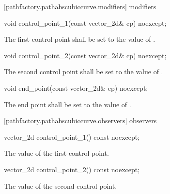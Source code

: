  [pathfactory.pathabscubiccurve.modifiers]{ modifiers}

\begin{itemdecl}
    void control_point_1(const vector_2d& cp) noexcept;
\end{itemdecl}
\begin{itemdescr}
	\pnum
	\effects
	The first control point shall be set to the value of .
\end{itemdescr}

\begin{itemdecl}
    void control_point_2(const vector_2d& cp) noexcept;
\end{itemdecl}
\begin{itemdescr}
	\pnum
	\effects
	The second control point shall be set to the value of .
\end{itemdescr}

\begin{itemdecl}
    void end_point(const vector_2d& ep) noexcept;
\end{itemdecl}
\begin{itemdescr}
	\pnum
	\effects
	The end point shall be set to the value of .
\end{itemdescr}

 [pathfactory.pathabscubiccurve.observers]{ observers}

\begin{itemdecl}
    vector_2d control_point_1() const noexcept;
\end{itemdecl}
\begin{itemdescr}
	\pnum
	\returns
	The value of the first control point.
\end{itemdescr}

\begin{itemdecl}
    vector_2d control_point_2() const noexcept;
\end{itemdecl}
\begin{itemdescr}
	\pnum
	\returns
	The value of the second control point.
\end{itemdescr}

